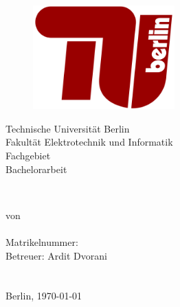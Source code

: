 
\newsavebox{\Prof}

\newsavebox{\Betr}
\begin{titlepage}



	\begin{figure}
		\begin{center}
			\includegraphics[height=4cm]{source/images/Logo/TU_Berlin_Logo.png}
		\end{center}
	\end{figure}

	\begin{center}

	{\Large Technische Universität Berlin}\\[1mm]
	{\large Fakultät Elektrotechnik und Informatik}\\
	{\large Fachgebiet \Fachgebiet}\\
	\vspace{1cm}
	{\LARGE  Bachelorarbeit}

	\vspace{0.5cm}

	{\LARGE\textbf{ \TitelArbeit}}\\


	\vspace{1.cm}

	von\\[2mm]

	\textbf{\large{\DeinName}}\\
	Matrikelnummer: \MatrNo\\[1cm]

	Betreuer: Ardit Dvorani\\[2mm]

	\usebox{\Prof: \PrueferEins} \\
	\usebox{\Betr: \PrueferZwei} \\

	\vspace{1cm}
	Berlin, \today
	\end{center}
\end{titlepage}